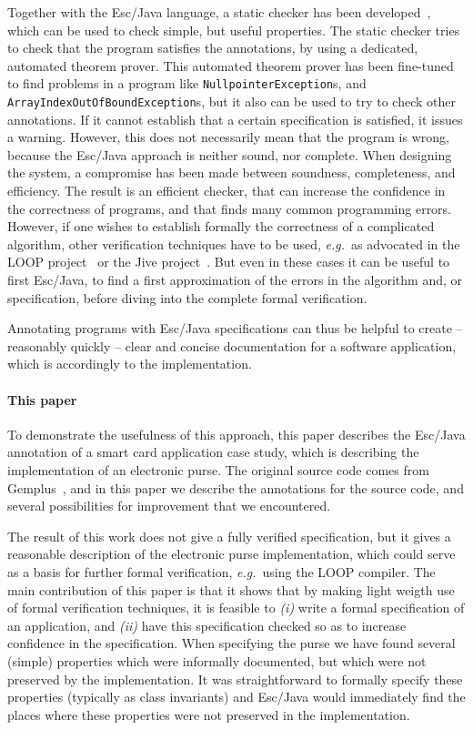 \documentclass[a4paper]{llncs}
\begin{document}
Together with the Esc/Java language, a static checker has been
developed~\cite{ESCJavaUrl}, which can be used to check simple, but useful
properties. The static checker tries to check that the program
satisfies the annotations, by using a dedicated, automated theorem
prover. This automated theorem prover has been fine-tuned to find
problems in a program like \texttt{NullpointerException}s, and
\texttt{ArrayIndexOutOf\-BoundException}s, but it also can be used to
try to check other annotations. If it cannot establish that a certain
specification is satisfied, it issues a warning. However, this does
not necessarily mean that the program is wrong, because the Esc/Java
approach is neither sound, nor complete. When designing the system, a
compromise has been made between soundness, completeness, and
efficiency. The result is an efficient checker, that can increase the
confidence in the correctness of programs, and that finds many common
programming errors. However, if one wishes to establish formally the
correctness of a complicated algorithm, other verification techniques
have to be used, \emph{e.g.}~as advocated in the LOOP
project~\cite{LOOPUrl} or the Jive project~\cite{MeyerP00}. But even in these 
cases it can be useful to first Esc/Java, to find a first
approximation of the errors in the algorithm and, or specification,
before diving into the complete formal verification. 

Annotating programs with Esc/Java specifications can thus be helpful
to create -- reasonably quickly -- clear and concise documentation for
a software application, which is accordingly to the implementation.

\paragraph{This paper}
To demonstrate the usefulness of this approach, this paper describes
the Esc/Java annotation of a smart card application case study, which
is describing the implementation of an electronic purse. The original
source code comes from Gemplus~\cite{PurseUrl}, and in this paper we describe 
the annotations for the source code, and several possibilities for
improvement that we encountered.  

The result of this work does not give a fully verified specification,
but it gives a reasonable description of the electronic purse
implementation, which could serve as a basis for further formal
verification, \emph{e.g.}~using the LOOP compiler.  The main
contribution of this paper is that it shows that by making light
weigth use of formal verification techniques, it is feasible to
\emph{(i)} write a formal specification of an application, and
\emph{(ii)} have this specification checked so as to increase
confidence in the specification. When specifying the purse we have
found several (simple) properties which were informally
documented, but which were not preserved by the implementation. It was 
straightforward to formally specify these properties (typically as
class invariants) and Esc/Java would immediately find the places where 
these properties were not preserved in the implementation.
\end{document}
